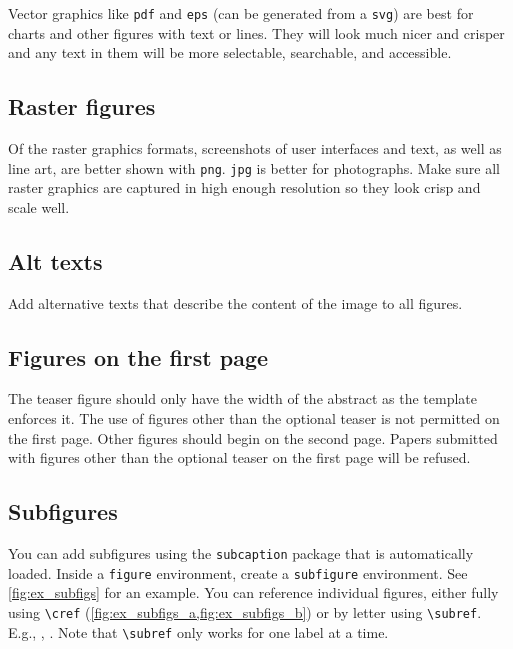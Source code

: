 \documentclass[journal]{vgtc}                     %
\begin{document}
Vector graphics like \texttt{pdf} and \texttt{eps} (can be generated from a \texttt{svg}) are best for charts and other figures with text or lines.
They will look much nicer and crisper and any text in them will be more selectable, searchable, and accessible.

\subsection{Raster figures}

Of the raster graphics formats, screenshots of user interfaces and text, as well as line art, are better shown with \texttt{png}.
\texttt{jpg} is better for photographs.
Make sure all raster graphics are captured in high enough resolution so they look crisp and scale well.

\subsection{Alt texts}

Add alternative texts that describe the content of the image to all figures.

\subsection{Figures on the first page}

The teaser figure should only have the width of the abstract as the template enforces it.
The use of figures other than the optional teaser is not permitted on the first page.
Other figures should begin on the second page.
Papers submitted with figures other than the optional teaser on the first page will be refused.

\subsection{Subfigures}

You can add subfigures using the \texttt{subcaption} package that is automatically loaded.
Inside a \verb|figure| environment, create a \verb|subfigure| environment.
See \cref{fig:ex_subfigs} for an example.
You can reference individual figures, either fully using \verb|\cref| (\cref{fig:ex_subfigs_a,fig:ex_subfigs_b}) or by letter using \verb|\subref|.
E.g., , .
Note that \verb|\subref| only works for one label at a time.
\end{document}
